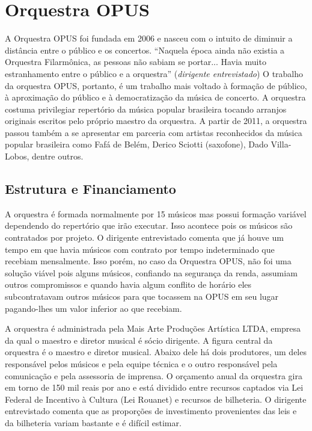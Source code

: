 \documentclass[a4paper, 12pt, openright, oneside, german, french, english, brazil]{abntex2}
\begin{document}
	
	
	
	
	\section{Orquestra OPUS}
	
	A Orquestra OPUS foi fundada em 2006 e nasceu com o intuito de diminuir a distância entre o público e os concertos. ``Naquela época ainda não existia a Orquestra Filarmônica, as pessoas não sabiam se portar... Havia muito estranhamento entre o público e a orquestra'' (\textit{dirigente entrevistado}) O trabalho da orquestra OPUS, portanto, é um trabalho mais voltado à formação de público, à aproximação do público e à democratização da música de concerto. A orquestra costuma privilegiar repertório da música popular brasileira tocando arranjos originais escritos pelo próprio maestro da orquestra. A partir de 2011, a orquestra passou também a se apresentar em parceria com artistas reconhecidos da música popular brasileira como Fafá de Belém, Derico Sciotti (saxofone), Dado Villa-Lobos, dentre outros. 
	
	\subsection{Estrutura e Financiamento}
	
	A orquestra é formada normalmente por 15 músicos mas possui formação variável dependendo do repertório que irão executar. Isso acontece pois os músicos são contratados por projeto. O dirigente entrevistado comenta que já houve um tempo em que havia músicos com contrato por tempo indeterminado que recebiam mensalmente. Isso porém, no caso da Orquestra OPUS, não foi uma solução viável pois alguns músicos, confiando na segurança da renda, assumiam outros compromissos e quando havia algum conflito de horário eles subcontratavam outros músicos para que tocassem na OPUS em seu lugar pagando-lhes um valor inferior ao que recebiam.
	
	A orquestra é administrada pela Mais Arte Produções Artística LTDA, empresa da qual o maestro e diretor musical é sócio dirigente. A figura central da orquestra é o maestro e diretor musical. Abaixo dele há dois produtores, um deles responsável pelos músicos e pela equipe técnica e o outro responsável pela comunicação e pela assessoria de imprensa. O orçamento anual da orquestra gira em torno de 150 mil reais por ano e está dividido entre recursos captados via Lei Federal de Incentivo à Cultura (Lei Rouanet) e recursos de bilheteria. O dirigente entrevistado comenta que as proporções de investimento provenientes das leis e da bilheteria variam bastante e é difícil estimar.
	
\end{document}
